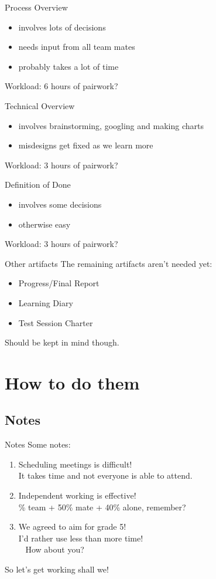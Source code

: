 \documentclass{beamer}
\begin{document}
\begin{frame}{Process Overview}{}
  \begin{itemize}
  \item involves lots of decisions
  \item needs input from all team mates
  \item probably takes a lot of time
  \end{itemize}
  Workload: 6 hours of pairwork?
\end{frame}
\begin{frame}{Technical Overview}{}
  \begin{itemize}
  \item involves brainstorming, googling and making charts
  \item misdesigns get fixed as we learn more
  \end{itemize}
  Workload: 3 hours of pairwork?
\end{frame}
\begin{frame}{Definition of Done}{}
  \begin{itemize}
  \item involves some decisions
  \item otherwise easy
  \end{itemize}
  Workload: 3 hours of pairwork?
\end{frame}
\begin{frame}{Other artifacts}{}
  The remaining artifacts aren't needed yet:
  \begin{itemize}
  \item Progress/Final Report
  \item Learning Diary
  \item Test Session Charter
  \end{itemize}
  Should be kept in mind though.
\end{frame}
\section{How to do them}
\subsection{Notes}
\begin{frame}{Notes}{}
  Some notes:
  \begin{enumerate}
  \pause \item Scheduling meetings is difficult! \\
  \pause It takes time and not everyone is able to attend.
  \pause \item Independent working is effective! \\
  \% team + 50\% mate + 40\% alone, remember?
  \pause \item We agreed to aim for grade 5! \\
  \pause I'd rather use \alert{less} than more time! \\
  ~ How about you?
  \end{enumerate}
  \pause So let's get working shall we!
\end{frame}
\end{document}
